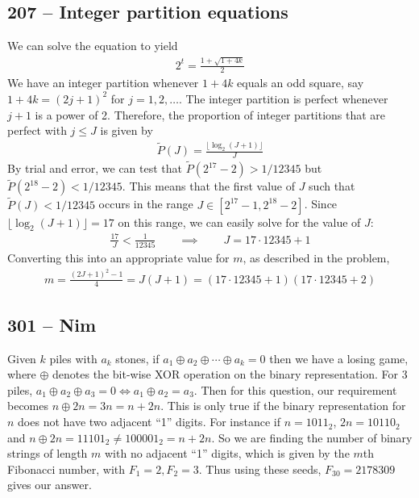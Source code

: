 \documentclass{article}
\begin{document}
\subsection*{207 -- Integer partition equations}
We can solve the equation to yield
\begin{align*}
	2^t = \frac{1 + \sqrt{1+4k}}{2}
\end{align*}
We have an integer partition whenever $1+4k$ equals an odd square, say $1 + 4k = (2j+1)^2$ for $j = 1, 2, \dotsc$.
The integer partition is perfect whenever $j+1$ is a power of 2.
Therefore, the proportion of integer partitions that are perfect with $j \leq J$ is given by
\begin{align*}
	\tilde P(J) = \frac{ \lfloor \log_2 (J+1) \rfloor }{J}
\end{align*}
By trial and error, we can test that $\tilde P(2^{17} - 2) > 1/12345$ but $\tilde P(2^{18} - 2) < 1/12345$.
This means that the first value of $J$ such that $\tilde P(J) < 1/12345$ occurs in the range $J \in [2^{17}-1, 2^{18} - 2]$.
Since $\lfloor \log_2 (J+1) \rfloor = 17$ on this range, we can easily solve for the value of $J$:
\begin{align*}
	\frac{17}{J} < \frac{1}{12345} \qquad \implies\qquad J = 17 \cdot 12345 + 1
\end{align*}
Converting this into an appropriate value for $m$, as described in the problem,
\begin{align*}
	m = \frac{(2J + 1)^2 - 1}{4} = J(J+1) = \boxed{(17 \cdot 12345 + 1)(17 \cdot 12345 + 2)}
\end{align*}


\subsection*{301 -- Nim}
Given $k$ piles with $a_k$ stones, if $a_1 \oplus a_2 \oplus \dotsb \oplus a_k = 0$ then we have a losing game, where $\oplus$ denotes the bit-wise XOR operation on the binary representation.
For 3 piles, $a_1 \oplus a_2 \oplus a_3 = 0 \iff a_1 \oplus a_2 = a_3$.
Then for this question, our requirement becomes $n \oplus 2n = 3n = n + 2n$.
This is only true if the binary representation for $n$ does not have two adjacent ``1'' digits.
For instance if $n = 1011_2$, $2n = 10110_2$ and $n \oplus 2n = 11101_2 \neq 100001_2 = n+2n$.
So we are finding the number of binary strings of length $m$ with no adjacent ``1'' digits, which is given by the $m$th Fibonacci number, with $F_1 = 2, F_2 = 3$.
Thus using these seeds, $F_{30} = \boxed{2178309}$ gives our answer.
\end{document}
